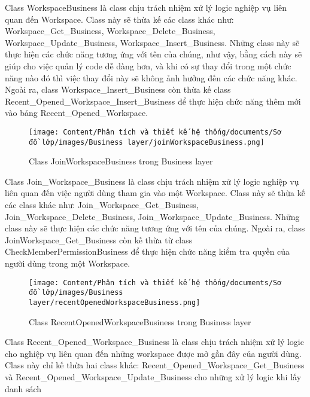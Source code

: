\par
Class WorkspaceBusiness là class chịu trách nhiệm xử lý logic nghiệp vụ liên quan
đến Workspace. Class này sẽ thừa kế các class khác như: Workspace\_Get\_Business,
Workspace\_Delete\_Business, Workspace\_Update\_Business, Workspace\_Insert\_Business.
Những class này sẽ thực hiện các chức năng tương ứng với tên của chúng, như vậy,
bằng cách này sẽ giúp cho việc quản lý code dễ dàng hơn, và khi có sự thay đổi
trong một chức năng nào đó thì việc thay đổi này sẽ không ảnh hưởng đến các chức
năng khác. Ngoài ra, class Workspace\_Insert\_Business còn thừa kế class
Recent\_Opened\_Workspace\_Insert\_Business để thực hiện chức năng thêm mới vào 
bảng Recent\_Opened\_Workspace.
\begin{figure}[H]
    \centering
    \texttt{[image: Content/Phân tích và thiết kế hệ thống/documents/Sơ đồ lớp/images/Business layer/joinWorkspaceBusiness.png]}
    \vspace{0.5cm}
    \caption{Class JoinWorkspaceBusiness trong Business layer}
    \label{fig:Class JoinWorkspaceBusiness trong Business layer}
\end{figure}
\par
Class Join\_Workspace\_Business là class chịu trách nhiệm xử lý logic nghiệp vụ liên quan đến
việc người dùng tham gia vào một Workspace. Class này sẽ thừa kế các class khác như:
Join\_Workspace\_Get\_Business, Join\_Workspace\_Delete\_Business, Join\_Workspace\_Update\_Business.
Những class này sẽ thực hiện các chức năng tương ứng với tên của chúng. Ngoài ra, class
JoinWorkspace\_Get\_Business còn kế thừa từ class CheckMemberPermissionBusiness để thực hiện
chức năng kiểm tra quyền của người dùng trong một Workspace.
\begin{figure}[H]
    \centering
    \texttt{[image: Content/Phân tích và thiết kế hệ thống/documents/Sơ đồ lớp/images/Business layer/recentOpenedWorkspaceBusiness.png]}
    \vspace{0.5cm}
    \caption{Class RecentOpenedWorkspaceBusiness trong Business layer}
    \label{fig:Class RecentOpenedWorkspaceBusiness trong Business layer}
\end{figure}
\par
Class Recent\_Opened\_Workspace\_Business là class chịu trách nhiệm xử lý logic
cho nghiệp vụ liên quan đến những workspace được mở gần đây của người dùng.
Class này chỉ kế thừa hai class khác: Recent\_Opened\_Workspace\_Get\_Business và
Recent\_Opened\_Workspace\_Update\_Business cho những xử lý logic khi lấy danh sách 
